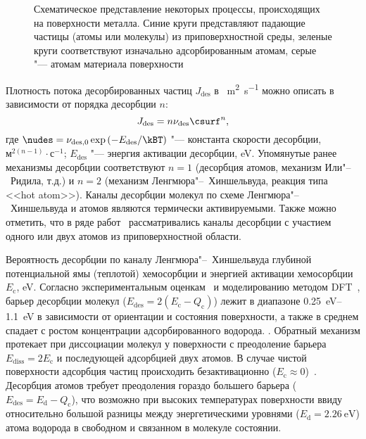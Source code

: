 \begin{figure}[ht]
    \caption{Схематическое представление некоторых процессы, происходящих на поверхности металла. Синие круги представляют падающие частицы (атомы или молекулы) из приповерхностной среды, зеленые круги соответствуют изначально адсорбированным атомам, серые "--- атомам материала поверхности}\label{fig:ch1/surface_processes}
\end{figure}

Плотность потока десорбированных частиц \( J_{\mathrm{des}} \) в \si{\per\meter\squared\per\second} можно описать в зависимости от порядка десорбции \( n \):
\begin{equation}
    \label{eq:ch1/des_flux}
    J_{\mathrm{des}} = n \nu_\mathrm{des} \csurf^n,
\end{equation}
где \( \nudes=\nu_{\mathrm{des},0} \exp \left( -E_\mathrm{des} / \kBT \right) \) "--- константа скорости десорбции, \(\text{м}^{2(n-1)}\cdot\text{с}^{-1}\); \( E_\mathrm{des} \) "--- энергия активации десорбции, \si{\electronvolt}. Упомянутые ранее механизмы десорбции соответствуют $n=1$ (десорбция атомов, механизм Или"--~Ридила, т.д.) и $n=2$ (механизм Ленгмюра"--~Хиншельвуда, реакция типа <<hot atom>>). Каналы десорбции молекул по схеме Ленгмюра"--~Хиншельвуда и атомов являются термически активируемыми. Также можно отметить, что в ряде работ~\cite{Baskes1980, Richards1988, Pisarev1997} рассматривались каналы десорбции с участием одного или двух атомов из приповерхностной области. 

Вероятность десорбции по каналу Ленгмюра"--~Хиншельвуда глубиной потенциальной ямы (теплотой) хемосорбции и энергией активации хемосорбции \( E_\mathrm{c} \), \si{\electronvolt}. Согласно экспериментальным оценкам~\cite{Tamm1969,Tamm1971,Markelj2013} и моделированию методом DFT~\cite{Piazza2018,Ajmalghan2019,Ferro2023}, барьер десорбции молекул (\( E_\mathrm{des}=2(E_\mathrm{c}-Q_\mathrm{c}) \)) лежит в диапазоне \SIrange{0.25}{1.1}{\electronvolt} в зависимости от ориентации и состояния поверхности, а также в среднем спадает с ростом концентрации адсорбированного водорода. .  Обратный механизм протекает при диссоциации молекул у поверхности с преодоление барьера \( E_\mathrm{diss}=2E_\mathrm{c} \) и последующей адсорбцией двух атомов. В случае чистой поверхности адсорбция частиц происходить безактивационно (\( E_\mathrm{c} \approx 0 \))~\cite{Piazza2018,Ajmalghan2019,Ferro2023}. Десорбция атомов требует преодоления гораздо большего барьера (\( E_\mathrm{des}=E_\mathrm{d}-Q_\mathrm{c} \)), что возможно при высоких температурах поверхности ввиду относительно большой разницы между энергетическими уровнями (\(E_\mathrm{d}=\SI{2.26}{\electronvolt}\)) атома водорода в свободном и связанном в молекуле состоянии.

